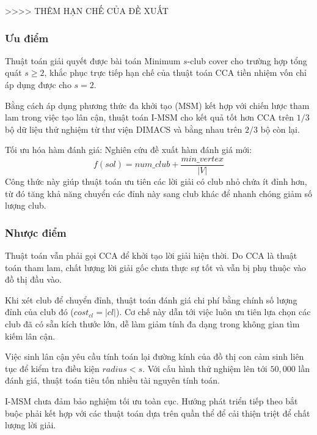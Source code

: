 >>>> THÊM HẠN CHẾ CỦA ĐỀ XUẤT


\subsubsection{Ưu điểm}

    Thuật toán giải quyết được bài toán Minimum $s$-club cover cho trường hợp tổng quát $s \ge 2$, khắc phục trực tiếp hạn chế của thuật toán CCA tiền nhiệm vốn chỉ áp dụng được cho $s=2$.
    
    Bằng cách áp dụng phương thức đa khởi tạo (MSM) kết hợp với chiến lược tham lam trong việc tạo lân cận, thuật toán I-MSM cho kết quả tốt hơn CCA trên $1/3$ bộ dữ liệu thử nghiệm từ thư viện DIMACS và bằng nhau trên $2/3$ bộ còn lại.
    
    Tối ưu hóa hàm đánh giá: Nghiên cứu đề xuất hàm đánh giá mới:
    \[
    f(sol) = num\_club + \frac{min\_vertex}{|V|}
    \]
    Công thức này giúp thuật toán ưu tiên các lời giải có club nhỏ chứa ít đỉnh hơn, từ đó tăng khả năng chuyển các đỉnh này sang club khác để nhanh chóng giảm số lượng club.

\subsubsection{Nhược điểm}

    Thuật toán vẫn phải gọi CCA để khởi tạo lời giải hiện thời. Do CCA là thuật toán tham lam, chất lượng lời giải gốc chưa thực sự tốt và vẫn bị phụ thuộc vào đồ thị đầu vào.
    
    Khi xét club để chuyển đỉnh, thuật toán đánh giá chi phí bằng chính số lượng đỉnh của club đó ($cost_{cl} = |cl|$). Cơ chế này dẫn tới việc luôn ưu tiên lựa chọn các club đã có sẵn kích thước lớn, dễ làm giảm tính đa dạng trong không gian tìm kiếm lân cận.
    
    Việc sinh lân cận yêu cầu tính toán lại đường kính của đồ thị con cảm sinh liên tục để kiểm tra điều kiện $radius < s$. Với cấu hình thử nghiệm lên tới $50{,}000$ lần đánh giá, thuật toán tiêu tốn nhiều tài nguyên tính toán.
    
    I-MSM chưa đảm bảo nghiệm tối ưu toàn cục. Hướng phát triển tiếp theo bắt buộc phải kết hợp với các thuật toán dựa trên quần thể để cải thiện triệt để chất lượng lời giải.








